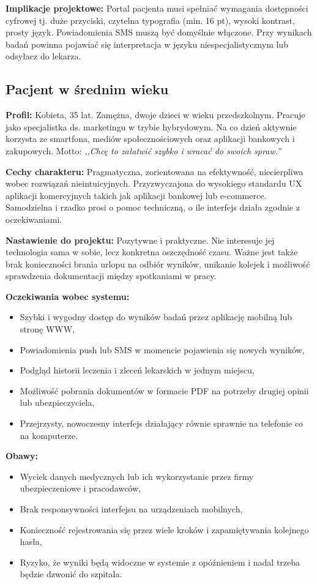\textbf{Implikacje projektowe:} Portal pacjenta musi spełniać wymagania dostępności cyfrowej tj. duże przyciski, czytelna typografia (min. 16 pt), wysoki kontrast, prosty język. Powiadomienia SMS muszą być domyślnie włączone. Przy wynikach badań powinna pojawiać się interpretacja w języku niespecjalistycznym lub odsyłacz do lekarza.
\subsection{Pacjent w średnim wieku}

\textbf{Profil:} Kobieta, 35 lat. Zamężna, dwoje dzieci w wieku przedszkolnym. Pracuje jako
specjalistka ds. marketingu w trybie hybrydowym. Na co dzień aktywnie korzysta ze smartfona,
mediów społecznościowych oraz aplikacji bankowych i zakupowych. Motto:
\emph{,,Chcę to załatwić szybko i wracać do swoich spraw.''}

\textbf{Cechy charakteru:} Pragmatyczna, zorientowana na efektywność, niecierpliwa wobec
rozwiązań nieintuicyjnych. Przyzwyczajona do wysokiego standardu UX aplikacji komercyjnych takich jak aplikacji bankowej lub e-commerce. Samodzielna i rzadko
prosi o pomoc techniczną, o ile interfejs działa zgodnie z oczekiwaniami.

\textbf{Nastawienie do projektu:} Pozytywne i praktyczne. Nie interesuje jej technologia sama
w sobie, lecz konkretna oszczędność czasu. Ważne jest także brak konieczności brania urlopu na odbiór
wyników, unikanie kolejek i możliwość sprawdzenia dokumentacji między spotkaniami w pracy.

\textbf{Oczekiwania wobec systemu:}
\begin{itemize}
    \item Szybki i wygodny dostęp do wyników badań przez aplikację mobilną lub stronę WWW,
    \item Powiadomienia push lub SMS w momencie pojawienia się nowych wyników,
    \item Podgląd historii leczenia i zleceń lekarskich w jednym miejscu,
    \item Możliwość pobrania dokumentów w formacie PDF na potrzeby drugiej opinii lub ubezpieczyciela,
    \item Przejrzysty, nowoczesny interfejs działający równie sprawnie na telefonie co na komputerze.
\end{itemize}

\textbf{Obawy:} 
\begin{itemize}
    \item Wyciek danych medycznych lub ich wykorzystanie przez firmy ubezpieczeniowe i pracodawców,
    \item Brak responsywności interfejsu na urządzeniach mobilnych,
    \item Konieczność rejestrowania się przez wiele kroków i zapamiętywania kolejnego hasła,
    \item Ryzyko, że wyniki będą widoczne w systemie z opóźnieniem i nadal trzeba będzie dzwonić do szpitala.
\end{itemize}

